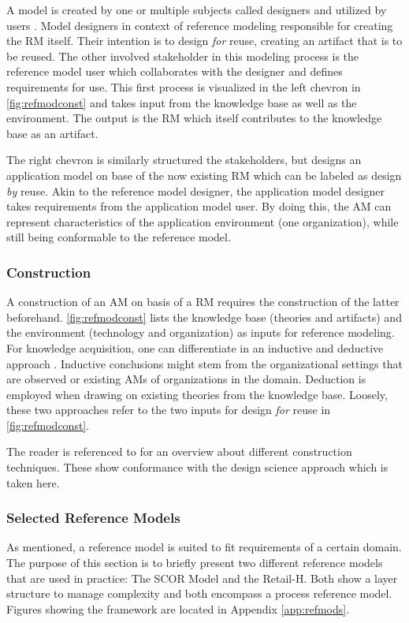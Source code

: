 		A model is created by one or multiple subjects called designers and utilized by users \citep{becker2004handelsinformationssysteme}. Model designers in context of reference modeling responsible for creating the \acrshort{RM} itself. Their intention is to design \textit{for} reuse, \ie creating an artifact that is to be reused. The other involved stakeholder in this modeling process is the reference model user which collaborates with the designer and defines requirements for use. This first process is visualized in the left chevron in \Fig \ref{fig:refmodconst} and takes input from the knowledge base as well as the environment. The output is the  \acrshort{RM} which itself contributes to the knowledge base as an artifact. 
		
		The right chevron is similarly structured \wrt the stakeholders, but designs an application model on base of the now existing \acrshort{RM} which can be labeled as design \textit{by} reuse. Akin to the reference model designer, the application model designer takes requirements from the application model user. By doing this, the  \acrshort{AM} can represent characteristics of the application environment (\ie one organization), while still being conformable to the reference model. 
		
		\subsubsection{Construction}
		A construction of an \acrshort{AM} on basis of a \acrshort{RM} requires the construction of the latter beforehand. 
		\Fig \ref{fig:refmodconst} lists the knowledge base (theories and artifacts) and the environment (technology and organization) as inputs for reference modeling. For knowledge acquisition, one can differentiate in an inductive and deductive approach \citep{thomas2006mang}. Inductive conclusions  might stem from the organizational settings that are observed or existing \acrshort{AM}s of organizations in the domain. Deduction is employed when drawing on existing theories from the knowledge base. Loosely, these two approaches refer to the two inputs for design \textit{for} reuse in \Fig \ref{fig:refmodconst}. 
		
		The reader is referenced to \cite{Fettke2014meth} for an overview about different construction techniques. These show conformance with the design science approach \citep[]{Puster2015} which is taken here. 
		
		
		\subsubsection{Selected Reference Models}
		\label{mod:scor}
		As mentioned, a reference model is suited to fit requirements of a certain domain. The purpose of this section is to briefly present two different reference models that are used in practice: The \acrfull{SCOR} Model and the Retail-H. Both show a layer structure to manage complexity and both encompass a process reference model. Figures showing the framework are located in Appendix \ref{app:refmods}.
		
